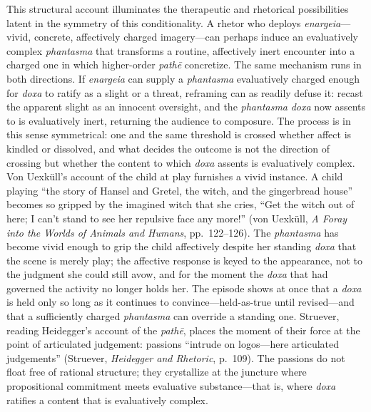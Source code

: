 \documentclass{article}
\begin{document}
This structural account illuminates the therapeutic and rhetorical possibilities latent in the symmetry of this conditionality. A rhetor who deploys \textit{enargeia}---vivid, concrete, affectively charged imagery---can perhaps induce an evaluatively complex \textit{phantasma} that transforms a routine, affectively inert encounter into a charged one in which higher-order \textit{pathē} concretize. The same mechanism runs in both directions. If \textit{enargeia} can supply a \textit{phantasma} evaluatively charged enough for \textit{doxa} to ratify as a slight or a threat, reframing can as readily defuse it: recast the apparent slight as an innocent oversight, and the \textit{phantasma} \textit{doxa} now assents to is evaluatively inert, returning the audience to composure. The process is in this sense symmetrical: one and the same threshold is crossed whether affect is kindled or dissolved, and what decides the outcome is not the direction of crossing but whether the content to which \textit{doxa} assents is evaluatively complex. Von Uexküll's account of the child at play furnishes a vivid instance. A child playing ``the story of Hansel and Gretel, the witch, and the gingerbread house'' becomes so gripped by the imagined witch that she cries, ``Get the witch out of here; I can't stand to see her repulsive face any more!'' (von Uexküll, \textit{A Foray into the Worlds of Animals and Humans}, pp.~122--126). The \textit{phantasma} has become vivid enough to grip the child affectively despite her standing \textit{doxa} that the scene is merely play; the affective response is keyed to the appearance, not to the judgment she could still avow, and for the moment the \textit{doxa} that had governed the activity no longer holds her. The episode shows at once that a \textit{doxa} is held only so long as it continues to convince---held-as-true until revised---and that a sufficiently charged \textit{phantasma} can override a standing one. Struever, reading Heidegger's account of the \textit{pathē}, places the moment of their force at the point of articulated judgement: passions ``intrude on logos---here articulated judgements'' (Struever, \textit{Heidegger and Rhetoric}, p.~109). The passions do not float free of rational structure; they crystallize at the juncture where propositional commitment meets evaluative substance---that is, where \textit{doxa} ratifies a content that is evaluatively complex.
\end{document}
